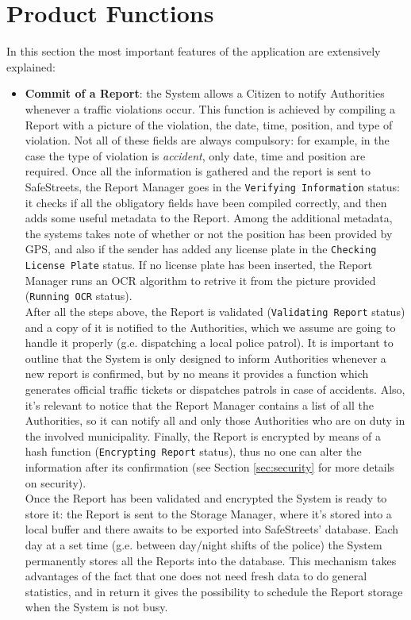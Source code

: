 \documentclass{report}
\begin{document}
\section{Product Functions}
In this section the most important features of the application are extensively explained:
\begin{itemize}
	\item \textbf{Commit of a Report}: the System allows a Citizen to notify Authorities whenever a traffic violations occur. This function is achieved by compiling a Report with a picture of the violation, the date, time, position, and type of violation. Not all of these fields are always compulsory: for example, in the case the type of violation is \textit{accident}, only date, time and position are required. Once all the information is gathered and the report is sent to SafeStreets, the Report Manager goes in the \texttt{Verifying Information} status: it checks if all the obligatory fields have been compiled correctly, and then adds some useful metadata to the Report. Among the additional metadata, the systems takes note of whether or not the position has been provided by GPS, and also if the sender has added any license plate in the \texttt{Checking License Plate} status. If no license plate has been inserted, the Report Manager runs an OCR algorithm to retrive it from the picture provided (\texttt{Running OCR} status). \\
	After all the steps above, the Report is validated (\texttt{Validating Report} status) and a copy of it is notified to the Authorities, which we assume are going to handle it properly (g.e. dispatching a local police patrol). It is important to outline that the System is only designed to inform Authorities whenever a new report is confirmed, but by no means it provides a function which generates official traffic tickets or dispatches patrols in case of accidents. Also, it's relevant to notice that the Report Manager contains a list of all the Authorities, so it can notify all and only those Authorities who are on duty in the involved municipality. Finally, the Report is encrypted by means of a hash function (\texttt{Encrypting Report} status), thus no one can alter the information after its confirmation (see Section \ref{sec:security} for more details on security). \\
	Once the Report has been validated and encrypted the System is ready to store it: the Report is sent to the Storage Manager, where it's stored into a local buffer and there awaits to be exported into SafeStreets' database. Each day at a set time (g.e. between day/night shifts of the police) the System permanently stores all the Reports into the database. This mechanism takes advantages of the fact that one does not need fresh data to do general statistics, and in return it gives the possibility to schedule the Report storage when the System is not busy.


\end{itemize}
\end{document}
